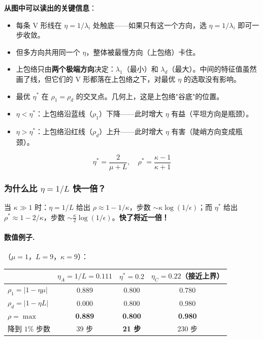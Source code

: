 \documentclass[12pt, a4paper]{ctexart}
\begin{document}
\textbf{从图中可以读出的关键信息}：
\begin{itemize}
    \item 每条 V 形线在 $\eta = 1/\lambda_i$ 处触底——如果只有这一个方向，选 $\eta = 1/\lambda_i$ 即可一步收敛。
    \item 但多方向共用同一个 $\eta$，整体被最慢方向（上包络）卡住。
    \item 上包络只由\textbf{两个极端方向}决定：$\lambda_1$（最小）和 $\lambda_d$（最大）。中间的特征值虽然画了线，但它们的 V 形都落在上包络之下，对最优 $\eta$ 的选取没有影响。
    \item 最优 $\eta^*$ 在 $\rho_1 = \rho_d$ 的交叉点。几何上，这是上包络"谷底"的位置。
    \item $\eta < \eta^*$：上包络沿蓝线（$\rho_1$）下降——此时增大 $\eta$ 有益（平坦方向是瓶颈）。
    \item $\eta > \eta^*$：上包络沿红线（$\rho_d$）上升——此时增大 $\eta$ 有害（陡峭方向变成瓶颈）。
\end{itemize}

\begin{keypoint}[最优步长与收敛因子]
\begin{equation}
    \boxed{\eta^* = \frac{2}{\mu + L}, \quad \rho^* = \frac{\kappa - 1}{\kappa + 1}}
\end{equation}
\end{keypoint}

\subsubsection{为什么比 $\eta = 1/L$ 快一倍？}

当 $\kappa \gg 1$ 时：$\eta = 1/L$ 给出 $\rho \approx 1 - 1/\kappa$，步数 $\sim \kappa \log(1/\epsilon)$；而 $\eta^*$ 给出 $\rho^* \approx 1 - 2/\kappa$，步数 $\sim \frac{\kappa}{2} \log(1/\epsilon)$。\textbf{快了将近一倍！}

\paragraph{数值例子.}（$\mu = 1$，$L = 9$，$\kappa = 9$）：

\begin{center}
\begin{tabular}{l|ccc}
 & $\eta_A = 1/L = 0.111$ & $\eta^* = 0.2$ & $\eta_C = 0.22$（接近上界）\\
\hline
$\rho_1 = |1-\eta\mu|$ & 0.889 & 0.800 & 0.780 \\
$\rho_d = |1-\eta L|$ & 0.000 & 0.800 & 0.980 \\
$\rho = \max$ & \textbf{0.889} & \textbf{0.800} & \textbf{0.980} \\
降到 $1\%$ 步数 & 39 步 & \textbf{21 步} & 230 步 \\
\end{tabular}
\end{center}
\end{document}
